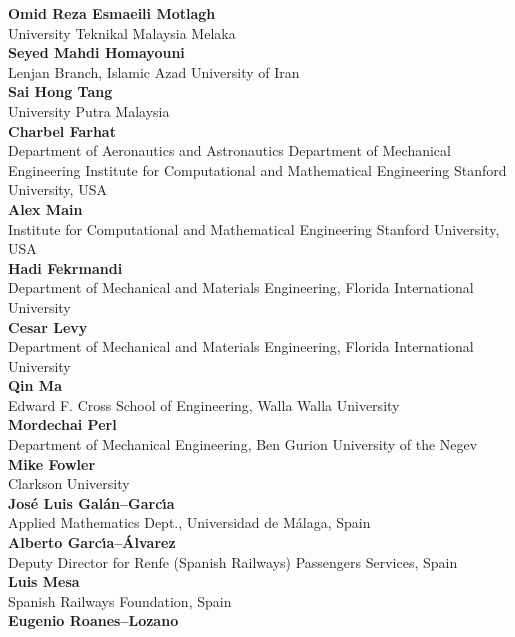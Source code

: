 \documentclass[article,A4,11pt]{llncs}%
\begin{document}
        \noindent
    {\bf Omid Reza Esmaeili Motlagh}\\
    University Teknikal Malaysia Melaka\\
        \noindent
    {\bf Seyed Mahdi Homayouni}\\
    Lenjan Branch,  Islamic Azad University of Iran\\
        \noindent
    {\bf Sai Hong Tang}\\
    University Putra Malaysia\\
        \noindent
    {\bf Charbel Farhat}\\
    Department of Aeronautics and Astronautics Department of Mechanical Engineering Institute for Computational and Mathematical Engineering Stanford University, USA\\
        \noindent
    {\bf Alex Main}\\
    Institute for Computational and Mathematical Engineering Stanford University, USA\\
        \noindent
    {\bf Hadi Fekrmandi}\\
    Department of Mechanical and Materials Engineering, Florida International University\\
        \noindent
    {\bf Cesar Levy}\\
    Department of Mechanical and Materials Engineering, Florida International University\\
        \noindent
    {\bf Qin Ma}\\
    Edward F. Cross School of Engineering, Walla Walla University\\
        \noindent
    {\bf Mordechai Perl}\\
    Department of Mechanical Engineering, Ben Gurion University of the Negev\\
        \noindent
    {\bf Mike Fowler}\\
    Clarkson University\\
        \noindent
    {\bf Jos\'e Luis Gal\'an--Garc\'{\i}a}\\
    Applied Mathematics Dept., Universidad de M\'alaga, Spain\\
        \noindent
    {\bf Alberto Garc\'{\i}a--\'Alvarez}\\
    Deputy Director for Renfe (Spanish Railways) Passengers Services, Spain\\
        \noindent
    {\bf Luis Mesa}\\
    Spanish Railways Foundation, Spain\\
        \noindent
    {\bf Eugenio Roanes--Lozano}\\
\end{document}
